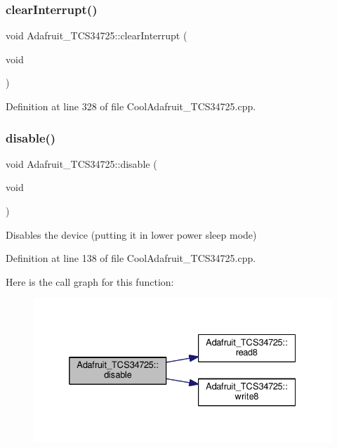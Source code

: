 \subsubsection{\texorpdfstring{clear\+Interrupt()}{clearInterrupt()}}
{\footnotesize\ttfamily void Adafruit\+\_\+\+T\+C\+S34725\+::clear\+Interrupt (\begin{DoxyParamCaption}\item[{void}]{ }\end{DoxyParamCaption})}



Definition at line 328 of file Cool\+Adafruit\+\_\+\+T\+C\+S34725.\+cpp.

\mbox{\label{class_adafruit___t_c_s34725_a79ac9b01a540f132d4bbf2edd2d6e8a2}} 
\subsubsection{\texorpdfstring{disable()}{disable()}}
{\footnotesize\ttfamily void Adafruit\+\_\+\+T\+C\+S34725\+::disable (\begin{DoxyParamCaption}\item[{void}]{ }\end{DoxyParamCaption})\hspace{0.3cm}{\ttfamily [private]}}

Disables the device (putting it in lower power sleep mode) 

Definition at line 138 of file Cool\+Adafruit\+\_\+\+T\+C\+S34725.\+cpp.

Here is the call graph for this function\+:\nopagebreak
\begin{figure}[H]
\begin{center}
\leavevmode
\includegraphics[width=332pt]{class_adafruit___t_c_s34725_a79ac9b01a540f132d4bbf2edd2d6e8a2_cgraph}
\end{center}
\end{figure}
\mbox{\label{class_adafruit___t_c_s34725_ad9a0e1f4f77d32dc0a6d604f7d1d5586}} 
